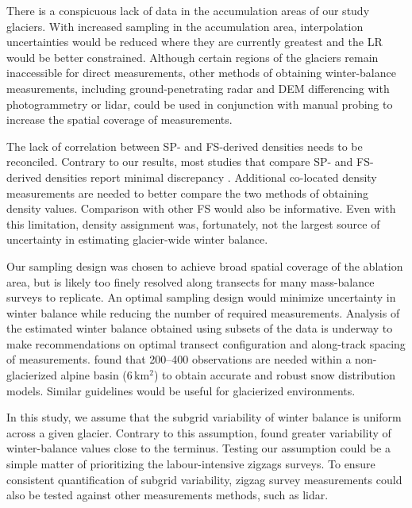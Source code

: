 \documentclass[twocolumn, letterpaper]{igs}
\begin{document}
There is a conspicuous lack of data in the accumulation areas of our study glaciers. With increased sampling in the accumulation area, interpolation uncertainties would be reduced where they are currently greatest and the LR would be better constrained. Although certain regions of the glaciers remain inaccessible for direct measurements, other methods of obtaining winter-balance measurements, including ground-penetrating radar and DEM differencing with photogrammetry or lidar, could be used in conjunction with manual probing to increase the spatial coverage of measurements.

The lack of correlation between SP- and FS-derived densities needs to be reconciled. Contrary to our results, most studies that compare SP- and FS-derived densities report minimal discrepancy \citep[e.g.][and sources within]{Dixon2012}. Additional co-located density measurements are needed to better compare the two methods of obtaining density values. Comparison with other FS would also be informative. Even with this limitation, density assignment was, fortunately, not the largest source of uncertainty in estimating glacier-wide winter balance. 

Our sampling design was chosen to achieve broad spatial coverage of the ablation area, but is likely too finely resolved along transects for many mass-balance surveys to replicate. An optimal sampling design would minimize uncertainty in winter balance while reducing the number of required measurements. Analysis of the estimated winter balance obtained using subsets of the data is underway to make recommendations on optimal transect configuration and along-track spacing of measurements. \cite{Lopez2010} found that 200--400 observations are needed within a non-glacierized alpine basin (6\,km$^2$) to obtain accurate and robust snow distribution models. Similar guidelines would be useful for glacierized environments.

In this study, we assume that the subgrid variability of winter balance is uniform across a given glacier. Contrary to this assumption, \cite{McGrath2015} found greater variability of winter-balance values close to the terminus. Testing our assumption could be a simple matter of prioritizing the labour-intensive zigzags surveys. To ensure consistent quantification of subgrid variability, zigzag survey measurements could also be tested against other measurements methods, such as lidar. 
\end{document}
